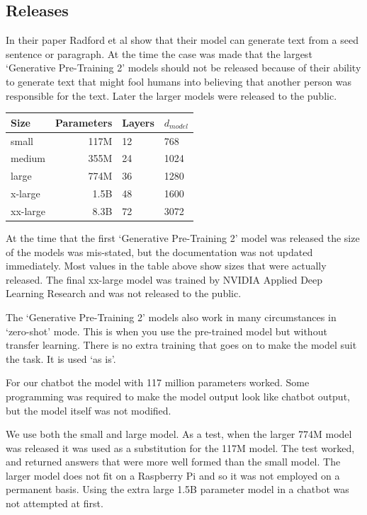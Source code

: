 \subsection{Releases}
In their paper Radford et al \cite{radford2019language} show that their model can generate text from a seed sentence or paragraph. At the time the case was made that the largest `Generative Pre-Training 2' models should not be released because of their ability to generate text that might fool humans into believing that another person was responsible for the text. Later the larger models were released to the public.

\begin{center}

\begin{tabular}{lrll}
	Size & Parameters & Layers & $d_{model}$ \\
	\hline
	small & 117M       & 12     & 768          \\
	medium & 355M       & 24     & 1024         \\
	large & 774M       & 36     & 1280         \\
	x-large & 1.5B     & 48     & 1600 \\
	xx-large & 8.3B   &  72 &   3072 
\end{tabular}

	
\end{center}

At the time that the first `Generative Pre-Training 2' model was released the size of the models was mis-stated, but the documentation was not updated immediately. Most values in the table above show sizes that were actually released. The final xx-large model was trained by NVIDIA Applied Deep Learning Research \cite{2019NVIDIAadlr} and was not released to the public.

The `Generative Pre-Training 2' models also work in many circumstances in `zero-shot' mode. This is when you use the pre-trained model but without transfer learning. There is no extra training that goes on to make the model suit the task. It is used `as is'.

For our chatbot the model with 117 million parameters worked. Some programming was required to make the model output look like chatbot output, but the model itself was not modified.

We use both the small and large model. As a test, when the larger 774M model was released it was used as a substitution for the 117M model. The test worked, and returned answers that were more well formed than the small model. The larger model does not fit on a Raspberry Pi and so it was not employed on a permanent basis. Using the extra large 1.5B parameter model in a chatbot was not attempted at first.

